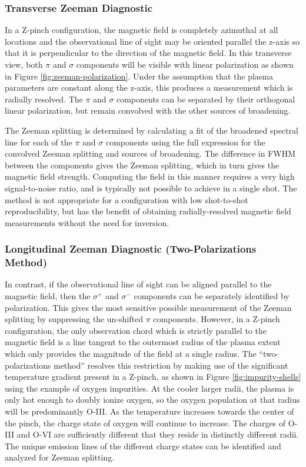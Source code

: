 \documentclass{jpp}
\begin{document}
\subsubsection{Transverse Zeeman Diagnostic}

In a Z-pinch configuration, the magnetic field is completely azimuthal at all locations and the observational line of sight may be oriented parallel the z-axis so that it is perpendicular to the direction of the magnetic field. In this transverse view, both $\pi$ and $\sigma$ components will be visible with linear polarization as shown in Figure \ref{fig:zeeman-polarization}. Under the assumption that the plasma parameters are constant along the z-axis, this produces a measurement which is radially resolved. The $\pi$ and $\sigma$ components can be separated by their orthogonal linear polarization, but remain convolved with the other sources of broadening.

The Zeeman splitting is determined by calculating a fit of the broadened spectral line for each of the $\pi$ and $\sigma$ components using the full expression for the convolved Zeeman splitting and sources of broadening. The difference in FWHM between the components gives the Zeeman splitting, which in turn gives the magnetic field strength. Computing the field in this manner requires a very high signal-to-noise ratio, and is typically not possible to achieve in a single shot. The method is not appropriate for a configuration with low shot-to-shot reproducibility, but has the benefit of obtaining radially-resolved magnetic field measurements without the need for inversion.

\subsubsection{Longitudinal Zeeman Diagnostic (Two-Polarizations Method)}

In contrast, if the observational line of sight can be aligned parallel to the magnetic field, then the $\sigma^+$ and $\sigma ^-$ components can be separately identified by polarization. This gives the most sensitive possible measurement of the Zeeman splitting by suppressing the un-shifted $\pi$ components. However, in a Z-pinch configuration, the only observation chord which is strictly parallel to the magnetic field is a line tangent to the outermost radius of the plasma extent which only provides the magnitude of the field at a single radius. The ``two-polarizations method'' resolves this restriction by making use of the significant temperature gradient present in a Z-pinch, as shown in Figure \ref{fig:impurity-shells} using the example of oxygen impurities. At the cooler larger radii, the plasma is only hot enough to doubly ionize oxygen, so the oxygen population at that radius will be predominantly O-III. As the temperature increases towards the center of the pinch, the charge state of oxygen will continue to increase. The charges of O-III and O-VI are sufficiently different that they reside in distinctly different radii. The unique emission lines of the different charge states can be identified and analyzed for Zeeman splitting.
\end{document}
